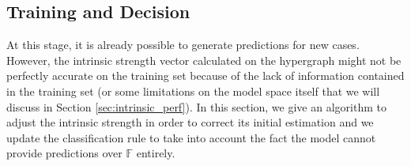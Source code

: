 \documentclass[preprint,12pt]{elsarticle}
\theoremstyle{definition}
\begin{document}
\subsection{Training and Decision}
\label{sec:decision_training}

At this stage, it is already possible to generate predictions for new cases. However, the intrinsic strength vector calculated on the hypergraph might not be perfectly accurate on the training set because of the lack of information contained in the training set (or some limitations on the model space itself that we will discuss in Section \ref{sec:intrinsic_perf}). In this section, we give an algorithm to adjust the intrinsic strength in order to correct its initial estimation and we update the classification rule to take into account the fact the model cannot provide predictions over $\mathbb F$ entirely.
\end{document}

